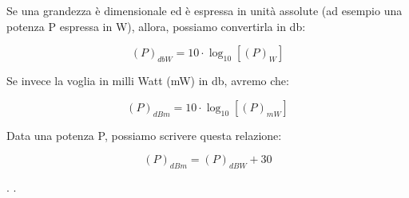 Se una grandezza è dimensionale ed è espressa in unità assolute (ad esempio una potenza P espressa in W), allora, possiamo convertirla in db: 

{
    \Large 
    \begin{equation}
        (P)_{dbW} = 10 \cdot \log_{10}[(P)_W]
    \end{equation}
} 

Se invece la voglia in milli Watt (mW) in db, avremo che: 

{
    \Large 
    \begin{equation}
        (P)_{dBm} = 10 \cdot \log_{10}[(P)_{mW}]
    \end{equation}
}

Data una potenza P, possiamo scrivere questa relazione: 

{
    \Large 
    \begin{equation}
        (P)_{dBm} = (P)_{dBW} + 30
    \end{equation}
} 

\newpage
.
\newpage
. 
\newpage
